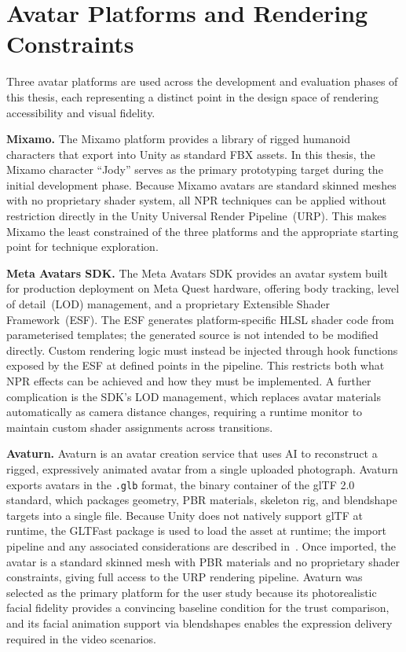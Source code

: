 \section{Avatar Platforms and Rendering Constraints}
\label{sec:platforms}

Three avatar platforms are used across the development and evaluation phases of this thesis, each representing a distinct point in the design space of rendering accessibility and visual fidelity.

\textbf{Mixamo.} The Mixamo platform provides a library of rigged humanoid characters that export into Unity as standard FBX assets. In this thesis, the Mixamo character ``Jody'' serves as the primary prototyping target during the initial development phase. Because Mixamo avatars are standard skinned meshes with no proprietary shader system, all NPR techniques can be applied without restriction directly in the Unity Universal Render Pipeline~(URP). This makes Mixamo the least constrained of the three platforms and the appropriate starting point for technique exploration.

\textbf{Meta Avatars SDK.} The Meta Avatars SDK provides an avatar system built for production deployment on Meta Quest hardware, offering body tracking, level of detail~(LOD) management, and a proprietary Extensible Shader Framework~(ESF). The ESF generates platform-specific HLSL shader code from parameterised templates; the generated source is not intended to be modified directly. Custom rendering logic must instead be injected through hook functions exposed by the ESF at defined points in the pipeline. This restricts both what NPR effects can be achieved and how they must be implemented. A further complication is the SDK's LOD management, which replaces avatar materials automatically as camera distance changes, requiring a runtime monitor to maintain custom shader assignments across transitions.

\textbf{Avaturn.} Avaturn is an avatar creation service that uses AI to reconstruct a rigged, expressively animated avatar from a single uploaded photograph. Avaturn exports avatars in the \texttt{.glb} format, the binary container of the glTF 2.0 standard, which packages geometry, PBR materials, skeleton rig, and blendshape targets into a single file. Because Unity does not natively support glTF at runtime, the GLTFast package is used to load the asset at runtime; the import pipeline and any associated considerations are described in~. Once imported, the avatar is a standard skinned mesh with PBR materials and no proprietary shader constraints, giving full access to the URP rendering pipeline. Avaturn was selected as the primary platform for the user study because its photorealistic facial fidelity provides a convincing baseline condition for the trust comparison, and its facial animation support via blendshapes enables the expression delivery required in the video scenarios.

